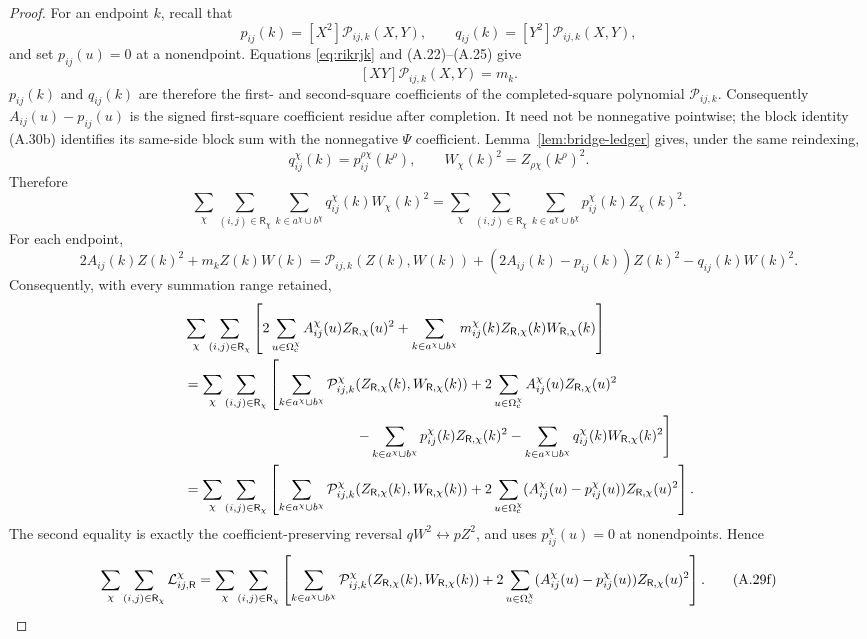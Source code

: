 \documentclass[11pt]{article}
\begin{document}
\begin{proof}
For an endpoint $k$, recall that
\[
 p_{ij}(k)=[X^2]\mathcal P_{ij,k}(X,Y),\qquad
 q_{ij}(k)=[Y^2]\mathcal P_{ij,k}(X,Y),
\]
and set $p_{ij}(u)=0$ at a nonendpoint.  Equations
\eqref{eq:rikrjk} and (A.22)--(A.25) give
\[
 [XY]\mathcal P_{ij,k}(X,Y)=m_k.
\]
$p_{ij}(k)$ and $q_{ij}(k)$ are therefore the first- and second-square
coefficients of the completed-square polynomial $\mathcal P_{ij,k}$.
Consequently $A_{ij}(u)-p_{ij}(u)$ is the signed first-square coefficient
residue after completion.  It need not be nonnegative pointwise; the block
identity (A.30b) identifies its same-side block sum with the nonnegative
$\Psi$ coefficient.
Lemma~\ref{lem:bridge-ledger} gives, under the same reindexing,
\[
q_{ij}^{\chi}(k)=p_{ij}^{\rho\chi}(k^\rho),
\qquad
W_\chi(k)^2=Z_{\rho\chi}(k^\rho)^2.
\]
Therefore
\[
 \sum_\chi\sum_{(i,j)\in\mathsf R_\chi}
 \sum_{k\in a^\chi\cup b^\chi}
 q_{ij}^{\chi}(k)W_\chi(k)^2
 =\sum_\chi\sum_{(i,j)\in\mathsf R_\chi}
 \sum_{k\in a^\chi\cup b^\chi}
 p_{ij}^{\chi}(k)Z_\chi(k)^2.
\]
For each endpoint,
\[
2A_{ij}(k)Z(k)^2+m_kZ(k)W(k)
=\mathcal P_{ij,k}(Z(k),W(k))
+(2A_{ij}(k)-p_{ij}(k))Z(k)^2
-q_{ij}(k)W(k)^2.
\]
Consequently, with every summation range retained,
\[
\begin{aligned}
&\sum_\chi\sum_{(i,j)\in\mathsf R_\chi}
\left[
2\sum_{u\in\Omega_{\rm c}^\chi}
A_{ij}^{\chi}(u)Z_{\mathsf R,\chi}(u)^2
+\sum_{k\in a^\chi\cup b^\chi}
m_{ij}^{\chi}(k)Z_{\mathsf R,\chi}(k)W_{\mathsf R,\chi}(k)
\right]\\
&=\sum_\chi\sum_{(i,j)\in\mathsf R_\chi}
\left[
\sum_{k\in a^\chi\cup b^\chi}
\mathcal P_{ij,k}^{\chi}
 (Z_{\mathsf R,\chi}(k),W_{\mathsf R,\chi}(k))
+2\sum_{u\in\Omega_{\rm c}^\chi}
A_{ij}^{\chi}(u)Z_{\mathsf R,\chi}(u)^2\right.\\
&\hspace{43mm}\left.
-\sum_{k\in a^\chi\cup b^\chi}
p_{ij}^{\chi}(k)Z_{\mathsf R,\chi}(k)^2
-\sum_{k\in a^\chi\cup b^\chi}
q_{ij}^{\chi}(k)W_{\mathsf R,\chi}(k)^2
\right]\\
&=\sum_\chi\sum_{(i,j)\in\mathsf R_\chi}
\left[
\sum_{k\in a^\chi\cup b^\chi}
\mathcal P_{ij,k}^{\chi}
 (Z_{\mathsf R,\chi}(k),W_{\mathsf R,\chi}(k))
+2\sum_{u\in\Omega_{\rm c}^\chi}
(A_{ij}^{\chi}(u)-p_{ij}^{\chi}(u))
Z_{\mathsf R,\chi}(u)^2
\right].
\end{aligned}
\]
The second equality is exactly the coefficient-preserving reversal
$qW^2\leftrightarrow pZ^2$, and uses
$p_{ij}^{\chi}(u)=0$ at nonendpoints.  Hence
\begin{equation}\label{eq:direct-package-ledger}
\sum_\chi\sum_{(i,j)\in\mathsf R_\chi}
\mathcal L_{ij,\mathsf R}^{\chi}
=\sum_\chi\sum_{(i,j)\in\mathsf R_\chi}\left[
 \sum_{k\in a^\chi\cup b^\chi}
 \mathcal P_{ij,k}^{\chi}
 (Z_{\mathsf R,\chi}(k),W_{\mathsf R,\chi}(k))
 +2\sum_{u\in\Omega_{\rm c}^\chi}
 (A_{ij}^{\chi}(u)-p_{ij}^{\chi}(u))
 Z_{\mathsf R,\chi}(u)^2
\right].
\tag{A.29f}
\end{equation}


\end{proof}
\end{document}
